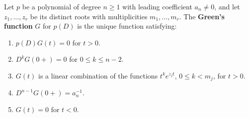 Let $p$ be a polynomial of degree $n \geq 1$ with leading coefficient $a_n \neq 0$, and let $z_1, \ldots, z_r$ be its distinct roots with multiplicities $m_1, \ldots, m_r$. The \textbf{Green's function} $G$ for $p(D)$ is the unique function satisfying:
\begin{enumerate}
\item[(7)] $p(D)G(t) = 0$ for $t > 0$.
\item[(8)] $D^k G(0+) = 0$ for $0 \leq k \leq n-2$.
\item[(9)] $G(t)$ is a linear combination of the functions $t^k e^{z_j t}$, $0 \leq k < m_j$, for $t > 0$.
\item[(10)] $D^{n-1} G(0+) = a_n^{-1}$.
\item[(11)] $G(t) = 0$ for $t < 0$.
\end{enumerate}
